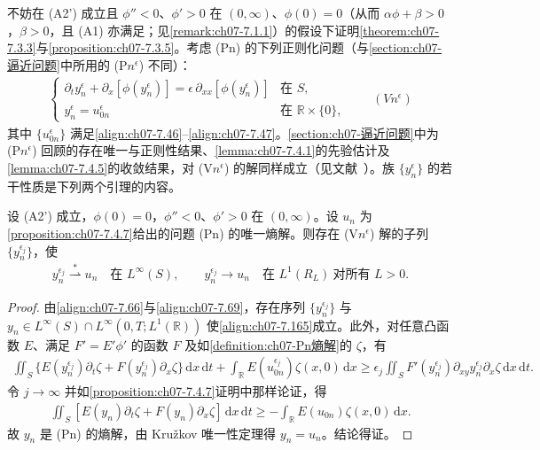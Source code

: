 \documentclass[../../main.tex]{subfiles}%
\begin{document}
不妨在 (A2') 成立且 $\phi''<0$、$\phi'>0$ 在 $(0,\infty)$、$\phi(0)=0$（从而 $\alpha\phi+\beta>0$，$\beta>0$，且 (A1) 亦满足；见\cref{remark:ch07-7.1.1}）的假设下证明\cref{theorem:ch07-7.3.3}与\cref{proposition:ch07-7.3.5}。考虑 (Pn) 的下列正则化问题（与\ref{section:ch07-逼近问题}中所用的 (P$n^\epsilon$) 不同）：
\begin{align*}
\begin{cases}
\partial_t y_n^\epsilon+\partial_x[\phi(y_n^\epsilon)]=\epsilon\,\partial_{xx}[\phi(y_n^\epsilon)] & \text{在 }S,\\
y_n^\epsilon=u_{0n}^\epsilon & \text{在 }\mathbb{R}\times\{0\},
\end{cases}
\qquad(Vn^\epsilon)
\end{align*}
其中 $\{u_{0n}^\epsilon\}$ 满足\eqref{align:ch07-7.46}--\eqref{align:ch07-7.47}。\ref{section:ch07-逼近问题}中为 (P$n^\epsilon$) 回顾的存在唯一与正则性结果、\cref{lemma:ch07-7.4.1}的先验估计及\cref{lemma:ch07-7.4.5}的收敛结果，对 (V$n^\epsilon$) 的解同样成立（见文献~\cite{ref63}）。族 $\{y_n^\epsilon\}$ 的若干性质是下列两个引理的内容。

\begin{lemma}\label{lemma:ch07-7.6.1}
设 (A2') 成立，$\phi(0)=0$，$\phi''<0$、$\phi'>0$ 在 $(0,\infty)$。设 $u_n$ 为\cref{proposition:ch07-7.4.7}给出的问题 (Pn) 的唯一熵解。则存在 (V$n^\epsilon$) 解的子列 $\{y_n^{\epsilon_j}\}$，使
\begin{align}
y_n^{\epsilon_j}\stackrel{*}{\rightharpoonup}u_n\quad\text{在 }L^\infty(S),\qquad
y_n^{\epsilon_j}\to u_n\quad\text{在 }L^1(R_L)\ \text{对所有 }L>0. \label{align:ch07-7.165}
\end{align}
\end{lemma}

\begin{proof}
由\eqref{align:ch07-7.66}与\eqref{align:ch07-7.69}，存在序列 $\{y_n^{\epsilon_j}\}$ 与 $y_n\in L^\infty(S)\cap L^\infty(0,T;L^1(\mathbb{R}))$ 使\eqref{align:ch07-7.165}成立。此外，对任意凸函数 $E$、满足 $F'=E'\phi'$ 的函数 $F$ 及如\cref{definition:ch07-Pn熵解}的 $\zeta$，有
\begin{align*}
\iint_S\{E(y_n^{\epsilon_j})\partial_t\zeta+F(y_n^{\epsilon_j})\partial_x\zeta\}\,\mathrm{d}x\,\mathrm{d}t
+\int_\mathbb{R}E(u_{0n}^{\epsilon_j})\zeta(x,0)\,\mathrm{d}x
\geqslant\epsilon_j\iint_S F'(y_n^{\epsilon_j})\partial_{xy}y_n^{\epsilon_j}\partial_x\zeta\,\mathrm{d}x\,\mathrm{d}t.
\end{align*}
令 $j\to\infty$ 并如\cref{proposition:ch07-7.4.7}证明中那样论证，得
\begin{align*}
\iint_S[E(y_n)\partial_t\zeta+F(y_n)\partial_x\zeta]\,\mathrm{d}x\,\mathrm{d}t
\geqslant-\int_\mathbb{R}E(u_{0n})\zeta(x,0)\,\mathrm{d}x.
\end{align*}
故 $y_n$ 是 (Pn) 的熵解，由 Kružkov 唯一性定理得 $y_n=u_n$。结论得证。
\end{proof}
\end{document}
